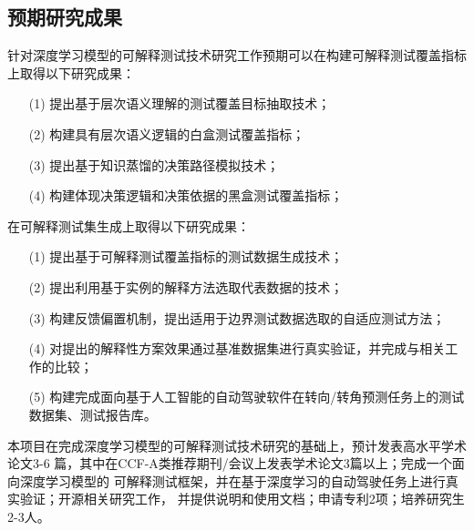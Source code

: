 \subsection{预期研究成果}

针对深度学习模型的可解释测试技术研究工作预期可以在构建可解释测试覆盖指标上取得以下研究成果：
\begin{itemize}[itemindent=2em]
    \item[(1)] 提出基于层次语义理解的测试覆盖目标抽取技术；
    \item[(2)] 构建具有层次语义逻辑的白盒测试覆盖指标；
    \item[(3)] 提出基于知识蒸馏的决策路径模拟技术；
    \item[(4)] 构建体现决策逻辑和决策依据的黑盒测试覆盖指标；
\end{itemize}

在可解释测试集生成上取得以下研究成果：
\begin{itemize}[itemindent=2em]
    \item[(1)] 提出基于可解释测试覆盖指标的测试数据生成技术；
    \item[(2)] 提出利用基于实例的解释方法选取代表数据的技术；
    \item[(3)] 构建反馈偏置机制，提出适用于边界测试数据选取的自适应测试方法；
    \item[(4)] 对提出的解释性方案效果通过基准数据集进行真实验证，并完成与相关工作的比较；
    \item[(5)] 构建完成面向基于人工智能的自动驾驶软件在转向/转角预测任务上的测试数据集、测试报告库。
\end{itemize}

本项目在完成深度学习模型的可解释测试技术研究的基础上，预计发表高水平学术论文3-6
篇，其中在CCF-A类推荐期刊/会议上发表学术论文3篇以上；完成一个面向深度学习模型的
可解释测试框架，并在基于深度学习的自动驾驶任务上进行真实验证；开源相关研究工作，
并提供说明和使用文档；申请专利2项；培养研究生2-3人。
